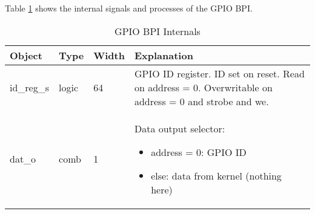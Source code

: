 
Table \ref{tab:asGpioPer07} shows the internal signals and processes of the GPIO BPI.
\begin{table}[H]
\caption{GPIO BPI Internals}
\label{tab:asGpioPer07}
\centering
\begin{tabularx}{\textwidth}{|l |l |l |X|}
  \hline
  Object & Type & Width & Explanation \\
  \hline
  \hline
  id\_reg\_s & logic & 64 & GPIO ID register. ID set on reset. Read on address = 0. Overwritable on address = 0 and strobe and we. \\
  \hline
  dat\_o & comb & 1 & Data output selector: \begin{itemize} 
                                                                        \item address = 0: GPIO ID
                                                                        \item else: data from kernel (nothing here)
                                                                      \end{itemize} \\
  \hline
\end{tabularx}
\end{table}
